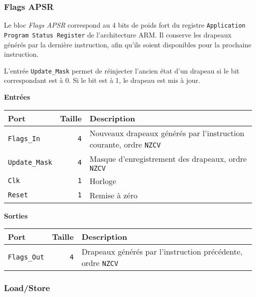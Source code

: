 \subsubsection{Flags APSR}



Le bloc \textit{Flags APSR} correspond au 4 bits de poids fort du registre \texttt{Application Program Status Register} de l'architecture ARM. Il conserve les drapeaux générés par la dernière instruction, afin qu'ils soient disponibles pour la prochaine instruction.

L'entrée \texttt{Update\_Mask} permet de réinjecter l'ancien état d'un drapeau si le bit correspondant est à 0. Si le bit est à 1, le drapeau est mis à jour.


\textbf{Entrées}\\

\begin{tabular}{|l|r|l|}
\hline
\textbf{Port}		& \textbf{Taille} & \textbf{Description}\\
\hline

\texttt{Flags\_In}	&  \texttt{4} & Nouveaux drapeaux générés par l'instruction courante, ordre \texttt{NZCV}\\
\hline
\texttt{Update\_Mask}	&  \texttt{4} & Masque d'enregistrement des drapeaux, ordre \texttt{NZCV}\\
\hline
\texttt{Clk}		&  \texttt{1} & Horloge\\
\hline
\texttt{Reset}		&  \texttt{1} & Remise à zéro\\


\hline
\end{tabular}

\vspace{1em}
\textbf{Sorties}\\

\begin{tabular}{|l|r|l|}
\hline 
\textbf{Port} & \textbf{Taille} & \textbf{Description}\\
\hline

\texttt{Flags\_Out}	&  \texttt{4} & Drapeaux générés par l'instruction précédente, ordre \texttt{NZCV}\\

\hline
\end{tabular}



\subsubsection{Load/Store}

